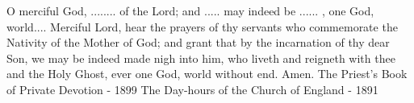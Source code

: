 O merciful God, ........ of the Lord; and ..... may indeed be ...... , one God, world....
Merciful Lord, hear the prayers of thy servants who commemorate the Nativity of the Mother of God; and grant that by the incarnation of thy dear Son, we may be indeed made nigh into him, who liveth and reigneth with thee and the Holy Ghost, ever one God, world without end.  Amen.
The Priest's Book of Private Devotion - 1899
The Day-hours of the Church of England - 1891